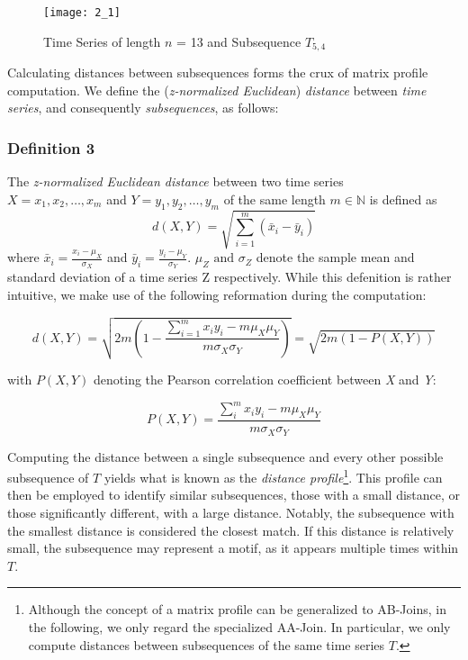 \begin{figure}[h!]
    \texttt{[image: 2\_1]}
    \centering
    \caption{Time Series of length \( \textit{n} \) = 13 and Subsequence \( T_{5,4} \) }
    \label{fig:time_series}
\end{figure}

Calculating distances between subsequences forms the crux of matrix profile computation. We define the (\textit{z-normalized Euclidean}) \textit{distance} between \textit{time series}, and consequently \textit{subsequences}, as follows:\\

\subsubsection{Definition 3} The \textit{z-normalized Euclidean distance} between two time series\\
$X = x_1, x_2, \ldots, x_m$ and $Y = y_1, y_2, \ldots, y_m$ of the same length $m \in \mathbb{N}$ is defined as
\[
    d(X, Y) = \sqrt{\sum_{i=1}^{m} \left(\bar{x}_i - \bar{y}_i \right)}
\]
where \( \bar{x}_i = \frac{x_i -  \mu_X}{\sigma_X} \) and \( \bar{y}_i = \frac{y_i -  \mu_Y}{\sigma_Y} \).
\( \mu_Z \text{ and } \sigma_Z \) denote the sample mean and standard deviation of a time series Z respectively. While this defenition is rather intuitive, we make use of the following reformation during the computation:

\begin{equation}
    d(X, Y) = \sqrt{2m\left(1 - \frac{\sum_{i=1}^{m}{x_iy_i - m\mu_X\mu_Y}}{m\sigma_X\sigma_Y}\right)} = \sqrt{2m\left(1 - P\left(X, Y\right)\right)}
    \label{eq:distance}
\end{equation}

with \( P(X, Y) \) denoting the Pearson correlation coefficient between \textit{X} and \textit{Y}:

\begin{equation}
    P(X, Y) = \frac{\sum_{i}^{m}{x_iy_i - m\mu_X\mu_Y}}{m\sigma_X\sigma_Y}
    \label{eq:pearson}
\end{equation}

Computing the distance between a single subsequence and every other possible subsequence of \(T\) yields what is known as the \textit{distance profile}\footnote{Although the concept of a matrix profile can be generalized to AB-Joins, in the following, we only regard the specialized AA-Join. In particular, we only compute distances between subsequences of the same time series \(T\).}. This profile can then be employed to identify similar subsequences, those with a small distance, or those significantly different, with a large distance. Notably, the subsequence with the smallest distance is considered the closest match. If this distance is relatively small, the subsequence may represent a motif, as it appears multiple times within \(T\).

